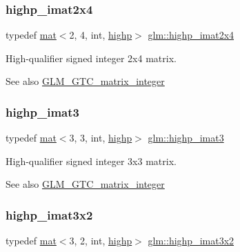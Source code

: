 \subsubsection{\texorpdfstring{highp\+\_\+imat2x4}{highp\_imat2x4}}
{\footnotesize\ttfamily typedef \hyperlink{structglm_1_1mat}{mat}$<$2, 4, int, \hyperlink{namespaceglm_a36ed105b07c7746804d7fdc7cc90ff25ac6f7eab42eacbb10d59a58e95e362074}{highp}$>$ \hyperlink{group__gtc__matrix__integer_ga5e3a9d05895fbefef19c051e60ca81c4}{glm\+::highp\+\_\+imat2x4}}

High-\/qualifier signed integer 2x4 matrix. \begin{DoxySeeAlso}{See also}
\hyperlink{group__gtc__matrix__integer}{G\+L\+M\+\_\+\+G\+T\+C\+\_\+matrix\+\_\+integer} 
\end{DoxySeeAlso}
\mbox{\label{group__gtc__matrix__integer_ga3a8088cb8c764ec1c3719f31b3687ba8}} 
\subsubsection{\texorpdfstring{highp\+\_\+imat3}{highp\_imat3}}
{\footnotesize\ttfamily typedef \hyperlink{structglm_1_1mat}{mat}$<$3, 3, int, \hyperlink{namespaceglm_a36ed105b07c7746804d7fdc7cc90ff25ac6f7eab42eacbb10d59a58e95e362074}{highp}$>$ \hyperlink{group__gtc__matrix__integer_ga3a8088cb8c764ec1c3719f31b3687ba8}{glm\+::highp\+\_\+imat3}}

High-\/qualifier signed integer 3x3 matrix. \begin{DoxySeeAlso}{See also}
\hyperlink{group__gtc__matrix__integer}{G\+L\+M\+\_\+\+G\+T\+C\+\_\+matrix\+\_\+integer} 
\end{DoxySeeAlso}
\mbox{\label{group__gtc__matrix__integer_gaf5097ad25b9a991ad010aba6736b333e}} 
\subsubsection{\texorpdfstring{highp\+\_\+imat3x2}{highp\_imat3x2}}
{\footnotesize\ttfamily typedef \hyperlink{structglm_1_1mat}{mat}$<$3, 2, int, \hyperlink{namespaceglm_a36ed105b07c7746804d7fdc7cc90ff25ac6f7eab42eacbb10d59a58e95e362074}{highp}$>$ \hyperlink{group__gtc__matrix__integer_gaf5097ad25b9a991ad010aba6736b333e}{glm\+::highp\+\_\+imat3x2}}

